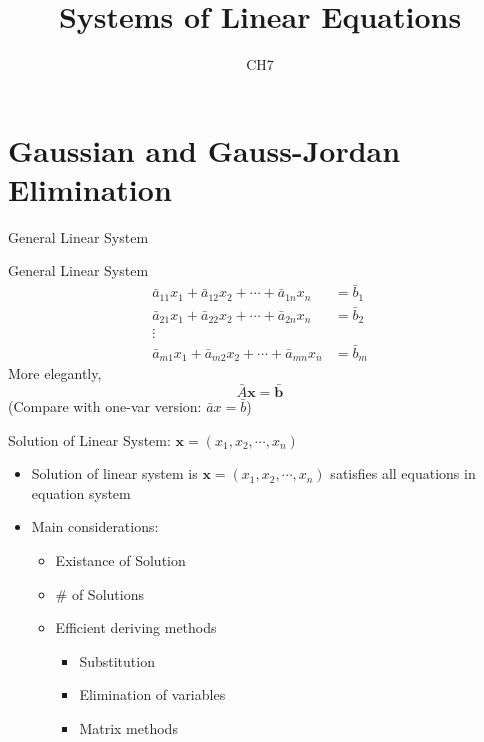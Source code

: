 \documentclass[final]{beamer}
\author[조남운]{\mail}
\title{Systems of Linear Equations}
\subtitle{CH7}
\begin{document}
	
\maketitle


\section{Gaussian and Gauss-Jordan Elimination} %
\label{sec:gaussian_and_gauss_jordan_elimination}
\begin{frame}[t]{General Linear System}
	\begin{block}
		{General Linear System}
		\begin{align*}
			\bar a_{11} x_1 + \bar a_{12}x_2 + \cdots + \bar a_{1n}x_n &= \bar b_1\\
			\bar a_{21} x_1 + \bar a_{22}x_2 + \cdots + \bar a_{2n}x_n &= \bar b_2\\
			\vdots\\
			\bar a_{m1} x_1 + \bar a_{m2}x_2 + \cdots + \bar a_{mn}x_n &= \bar b_m
		\end{align*}
		More elegantly, 
		\[
			\bar{A}\mathbf{x} = \bar{\mathbf{b}}
		\]
		(Compare with one-var version: $\bar a x = \bar b$)
	\end{block}
\end{frame}
\begin{frame}[t]{Solution of Linear System: $\mathbf{x}=(x_1,x_2,\cdots,x_n)$}
	\begin{itemize}
		\item Solution of linear system is $\mathbf{x}=(x_1,x_2,\cdots,x_n)$ satisfies all equations in equation system
		\item Main considerations:
		\begin{itemize}
			\item Existance of Solution
			\item \# of Solutions
			\item Efficient deriving methods
			\begin{itemize}
				\item Substitution
				\item Elimination of variables
				\item Matrix methods
			\end{itemize}
		\end{itemize}
	\end{itemize}
\end{frame}
\end{document}

